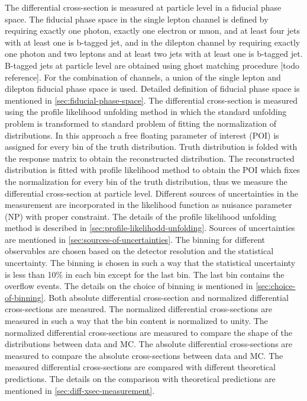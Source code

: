 The differential cross-section is measured at particle level in a fiducial phase space. The fiducial phase space in the single lepton channel is defined by requiring exactly one photon, exactly one electron or muon, and at least four jets with at least one is b-tagged jet, and in the dilepton channel by requiring exactly one photon and two leptons and at least two jets with at least one is b-tagged jet. B-tagged jets at particle level are obtained using ghost matching procedure [todo reference]. For the combination of channels, a union of the single lepton and dilepton fiducial phase space is used. Detailed definition of fiducial phase space is mentioned in \cref{sec:fiducial-phase-space}. The differential cross-section is measured using the profile likelihood unfolding method in which the standard unfolding problem is transformed to standard problem of fitting the normalization of distributions. In this approach a free floating parameter of interest (POI) is assigned for every bin of the truth distribution. Truth distribution is folded with the response matrix to obtain the reconstructed distribution. The reconstructed distribution is fitted with profile likelihood method to obtain the POI which fixes the normalization for every bin of the truth distribution, thus we measure the differential cross-section at particle level. Different sources of uncertainties in the measurement are incorporated in the likelihood function as nuisance parameter (NP) with proper constraint. The details of the profile likelihood unfolding method is described in \cref{sec:profile-likelihodd-unfolding}. Sources of uncertainties are mentioned in \cref{sec:sources-of-uncertainties}. The binning for different observables are chosen based on the detector resolution and the statistical uncertainty. The binning is chosen in such a way that the statistical uncertainty is less than 10\% in each bin except for the last bin. The last bin contains the overflow events. The details on the choice of binning is mentioned in \cref{sec:choice-of-binning}. Both absolute differential cross-section and normalized differential cross-sections are measured. The normalized differential cross-sections are measured in such a way that the bin content is normalized to unity. The normalized differential cross-sections are measured to compare the shape of the distributions between data and MC. The absolute differential cross-sections are measured to compare the absolute cross-sections between data and MC. The measured differential cross-sections are compared with different theoretical predictions. The details on the comparison with theoretical predictions are mentioned in \cref{sec:diff-xsec-measurement}.